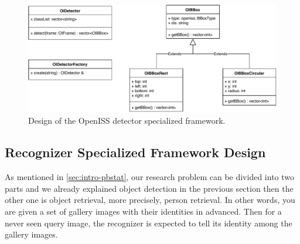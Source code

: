 \begin{figure}
    \centering
    \includegraphics[width=\linewidth]{figures/framework_sub_detector.pdf}
    \caption{Design of the OpenISS detector specialized framework.}
    \label{fig:fw-sub-detector}
\end{figure}

\subsection{Recognizer Specialized Framework Design}
\label{sec:fw-design-spec-recognizer}

As mentioned in \autoref{sec:intro-pbstat}, our research problem can be divided
into two parts and we already explained object detection in the previous
section then the other one is object retrieval, more precisely, person
retrieval.
In other words, you are given a set of gallery images with their identities in
advanced. Then for a never seen query image, the recognizer is expected to tell
its identity among the gallery images.

